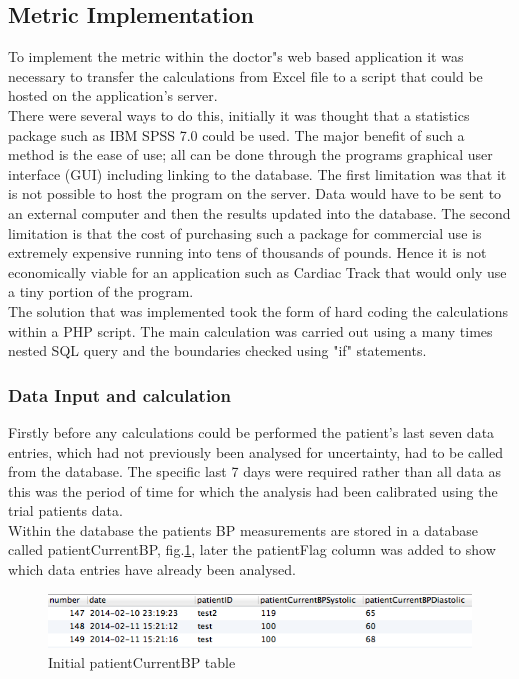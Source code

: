 \documentclass[11pt]{article}
\begin{document}
\subsection{Metric Implementation}
To implement the metric within the doctor"s web based application it was necessary to transfer the calculations from Excel file to a script that could be hosted on the application's server. 
\\ \indent There were several ways to do this, initially it was thought that a statistics package such as IBM SPSS 7.0 \cite{SPSS} could be used. The major benefit of such a method is the ease of use; all can be done through the programs graphical user interface (GUI) including linking to the database. The first limitation was that it is not possible to host the program on the server. Data would have to be sent to an external computer and then the results updated into the database. The second limitation is that the cost of purchasing such a package for commercial use is extremely expensive running into tens of thousands of pounds. Hence it is not economically viable for an application such as Cardiac Track that would only use a tiny portion of the program.
\\ \indent 
The solution that was implemented took the form of hard coding the calculations within a PHP script. The main calculation was carried out using a many times nested SQL query and the boundaries checked using "if" statements. 

\subsubsection{Data Input and calculation}
Firstly before any calculations could be performed the patient's last seven data entries, which had not previously been analysed for uncertainty, had to be called from the database. The specific last 7 days were required rather than all data as this was the period of time for which the analysis had been calibrated using the trial patients data.
\\ \indent 
Within the database the patients BP measurements are stored in a database called patientCurrentBP, fig.\ref{DB1}, later the patientFlag column was added to show which data entries have already been analysed.

\begin{figure}
\centering
\includegraphics[scale=0.4]{DB1.png}
\caption{Initial patientCurrentBP table \label{DB1}} 
\end{figure} 
\end{document}

